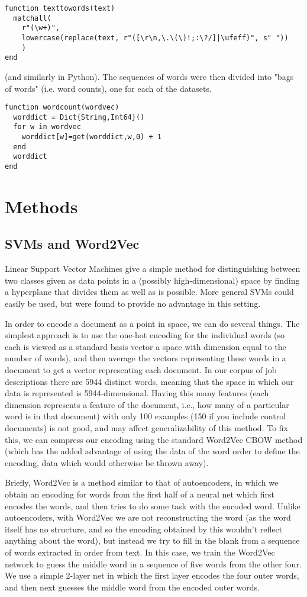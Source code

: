 \documentclass[12pt]{article}
\begin{document}
\begin{verbatim} 
function texttowords(text)
  matchall(
    r"(\w+)",
    lowercase(replace(text, r"([\r\n,\.\(\)!;:\?/]|\ufeff)", s" "))
    )
end
\end{verbatim}
(and similarly in Python). The sequences of words were then divided into "bags of words" (i.e. word counts), one for each of the datasets.

\begin{verbatim}
function wordcount(wordvec)
  worddict = Dict{String,Int64}()
  for w in wordvec
    worddict[w]=get(worddict,w,0) + 1
  end
  worddict
end
\end{verbatim}

\section{Methods}
\subsection{SVMs and Word2Vec} Linear Support Vector Machines give a simple method for distinguishing between two classes given as data points in a (possibly high-dimensional) space by finding a hyperplane that divides them as well as is possible. More general SVMs could easily be used, but were found to provide no advantage in this setting.

In order to encode a document as a point in space, we can do several things. The simplest approach is to use the one-hot encoding for the individual words (so each is viewed as a standard basis vector a space with dimension equal to the number of words), and then average the vectors representing these words in a document to get a vector representing each document. In our corpus of job descriptions there are 5944 distinct words, meaning that the space in which our data is represented is 5944-dimensional. Having this many features (each dimension represents a feature of the document, i.e., how many of a particular word is in that document) with only 100 examples (150 if you include control documents) is not good, and may affect generalizability of this method. To fix this, we can compress our encoding using the standard Word2Vec CBOW method (which has the added advantage of using the data of the word order to define the encoding, data which would otherwise be thrown away).

Briefly, Word2Vec is a method similar to that of autoencoders, in which we obtain an encoding for words from the first half of a neural net which first encodes the words, and then tries to do some task with the encoded word. Unlike autoencoders, with Word2Vec we are not reconstructing the word (as the word itself has no structure, and so the encoding obtained by this wouldn't reflect anything about the word), but instead we try to fill in the blank from a sequence of words extracted in order from text. In this case, we train the Word2Vec network to guess the middle word in a sequence of five words from the other four. We use a simple 2-layer net in which the first layer encodes the four outer words, and then next guesses the middle word from the encoded outer words.
\end{document}
